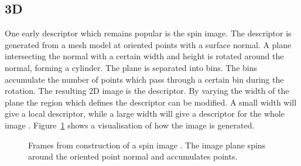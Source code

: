 \documentclass[11pt,a4paper]{kth-mag}
\begin{document}
\subsection{3D}
One early descriptor which remains popular is the spin image. The descriptor is
generated from a mesh model at oriented points with a surface normal. A plane
intersecting the normal with a certain width and height is rotated around the
normal, forming a cylinder. The plane is separated into bins. The bins
accumulate the number of points which pass through a certain bin during the
rotation. The resulting 2D image is the descriptor. By varying the width of the
plane the region which defines the descriptor can be modified. A small width
will give a local descriptor, while a large width will give a descriptor for the
whole image \cite{johnson1997spin,johnson1999using}. Figure~\ref{fig:spinimg}
shows a visualisation of how the image is generated.

\begin{figure}
  \centering
  \caption{Frames from construction of a spin image \cite{johnson1997spin}. The
    image plane spins around the oriented point normal and accumulates points.}
  \label{fig:spinimg}
\end{figure}
\end{document}
